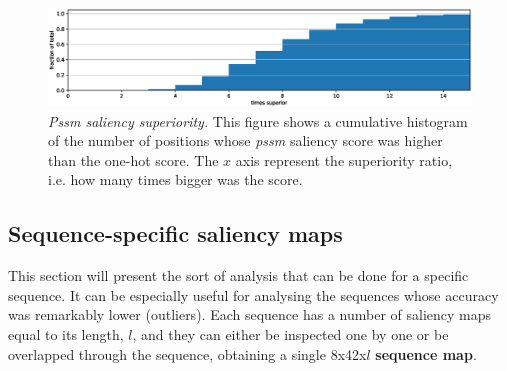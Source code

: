 \begin{figure}
	\centering
	\includegraphics[width=1\linewidth]{Figures/aa_pssm}
	\caption{\textit{Pssm saliency superiority.} This figure shows a cumulative histogram of the number of positions whose \textit{pssm} saliency score was higher than the one-hot score. The $x$ axis represent the superiority ratio, i.e. how many times bigger was the score.}
	\label{fig:aa_pssm}
\end{figure}


\subsection{Sequence-specific saliency maps}
This section will present the sort of analysis that can be done for a specific sequence. It can be especially useful for analysing the sequences whose accuracy was remarkably lower (outliers). Each sequence has a number of saliency maps equal to its length, $l$, and they can either be inspected one by one or be overlapped through the sequence, obtaining a single 8x42x$l$ \textbf{sequence map}.



